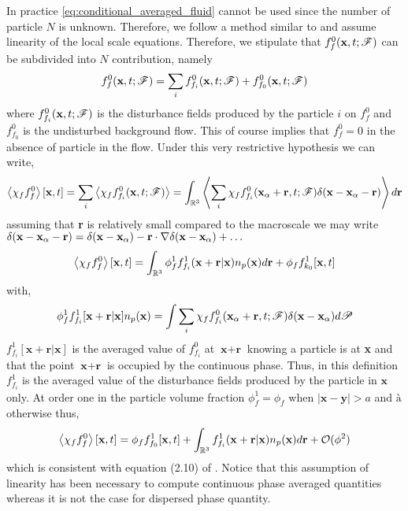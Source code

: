 In practice \ref{eq:conditional_averaged_fluid} cannot be used since the number of particle $N$ is unknown. 
Therefore, we follow a method similar to \citet{batchelor1972sedimentation} and assume linearity of the local scale equations. 
Therefore, we stipulate that $f_f^0(\textbf{x},t;\mathscr{F})$ can be subdivided into $N$ contribution, namely  
\begin{equation}
    f_f^0(\textbf{x},t;\mathscr{F})
    = 
    \sum_i
    f_{f_i}^0(\textbf{x},t;\mathscr{F})
    + f_{f_0}^0(\textbf{x},t;\mathscr{F})
\end{equation}
where $f_{f_i}^0(\textbf{x},t;\mathscr{F})$ is the disturbance fields produced by the particle $i$ on $f_f^0$ and $f_{f_0}^0$ is the undisturbed background flow. 
This of course implies that $f_f^0 = 0$ in the absence of particle in the flow. 
Under this very restrictive hypothesis we can write, 
\begin{equation}
    \left<\chi_ff_f^0\right>[\textbf{x},t]
    = 
    \sum_i
    \left<\chi_f f_{f_i}^0(\textbf{x},t;\mathscr{F})\right>
    = 
    \int_{\mathbb{R}^3} 
    \left<
        \sum_i
    \chi_f f_{f_i}^0(\textbf{x}_\alpha + \textbf{r},t;\mathscr{F}) \delta(\textbf{x} - \textbf{x}_\alpha - \textbf{r})\right>d\textbf{r}
\end{equation}
assuming that \textbf{r} is relatively small compared to the macroscale we may write $\delta(\textbf{x} - \textbf{x}_\alpha - \textbf{r}) =\delta(\textbf{x} - \textbf{x}_\alpha) - \textbf{r}\cdot \mathbf{\nabla}\delta(\textbf{x} - \textbf{x}_\alpha)+ \ldots$
\begin{equation}
    \left<\chi_ff_f^0\right>[\textbf{x},t]
    = 
    \int_{\mathbb{R}^3} 
    \phi_f^1
    f_{f_i}^1(\textbf{x}+ \textbf{r}| \textbf{x})
    n_p(\textbf{x}) 
    d\textbf{r}
    +
    \phi_f f_{k_0}^1[\textbf{x},t]  
\end{equation}
with, 
\begin{equation*}
    \phi_f^1 f_{f_i}^1[\textbf{x}+ \textbf{r}| \textbf{x}]n_p(\textbf{x}) 
    = 
    \int{
    \sum_i
    \chi_f f_{f_i}^0(\textbf{x}_\alpha + \textbf{r},t;\mathscr{F}) \delta(\textbf{x} - \textbf{x}_\alpha)
    }d\mathscr{P}
\end{equation*}
$f_{f_i}^1[\textbf{x}+ \textbf{r}| \textbf{x}]$ is the averaged value of $f_{f_i}^0$ at $\textbf{x}+\textbf{r}$ knowing a particle is at \textbf{x} and that the point $\textbf{x}+\textbf{r}$ is occupied by the continuous phase. 
Thus, in this definition $f_{f_i}^1$ is the averaged value of the disturbance fields produced by the particle in $\textbf{x}$ only.
At order one in the particle volume fraction $\phi_f^1 = \phi_f$ when $|\textbf{x}-\textbf{y}|>a$ and $à$ otherwise thus, 
\begin{equation}
    \left<\chi_f f_f^0\right>[\textbf{x},t]
    = 
    \phi_f f_{f_0}^1[\textbf{x},t]  
    + 
    \int_{\mathbb{R}^3} 
    f_{f_i}^1(\textbf{x}+ \textbf{r}| \textbf{x})
    n_p(\textbf{x}) 
    d\textbf{r}
    + \mathcal{O}({\phi^2})
\end{equation}
which is consistent with equation (2.10) of \citet{batchelor1972sedimentation}. 
Notice that this assumption of linearity has been necessary to compute continuous phase averaged quantities whereas it is not the case for dispersed phase quantity. 

